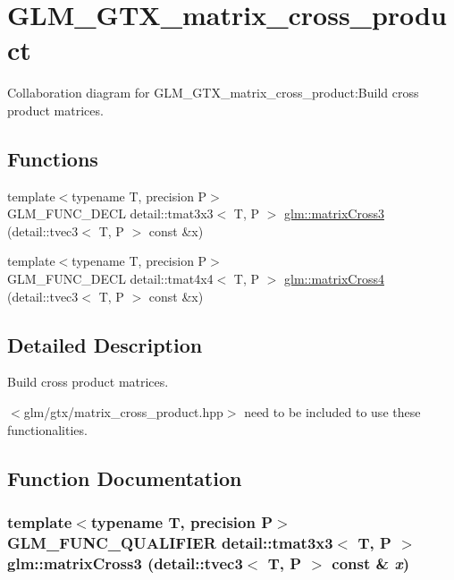 \hypertarget{group__gtx__matrix__cross__product}{
\section{GLM\_\-GTX\_\-matrix\_\-cross\_\-product}
\label{group__gtx__matrix__cross__product}
}


Collaboration diagram for GLM\_\-GTX\_\-matrix\_\-cross\_\-product:Build cross product matrices.  
\subsection*{Functions}
\begin{CompactItemize}
\item 
{\footnotesize template$<$typename T, precision P$>$ }\\GLM\_\-FUNC\_\-DECL detail::tmat3x3$<$ T, P $>$ \hyperlink{group__gtx__matrix__cross__product_g028629befca6d86f24f58e314827895c}{glm::matrixCross3} (detail::tvec3$<$ T, P $>$ const \&x)
\item 
{\footnotesize template$<$typename T, precision P$>$ }\\GLM\_\-FUNC\_\-DECL detail::tmat4x4$<$ T, P $>$ \hyperlink{group__gtx__matrix__cross__product_g9fae5322a4e4afe9742157f22b505635}{glm::matrixCross4} (detail::tvec3$<$ T, P $>$ const \&x)
\end{CompactItemize}


\subsection{Detailed Description}
Build cross product matrices. 

$<$glm/gtx/matrix\_\-cross\_\-product.hpp$>$ need to be included to use these functionalities. 

\subsection{Function Documentation}
\hypertarget{group__gtx__matrix__cross__product_g028629befca6d86f24f58e314827895c}{
\subsubsection[matrixCross3]{\setlength{\rightskip}{0pt plus 5cm}template$<$typename T, precision P$>$ GLM\_\-FUNC\_\-QUALIFIER detail::tmat3x3$<$ T, P $>$ glm::matrixCross3 (detail::tvec3$<$ T, P $>$ const \& {\em x})}}
\label{group__gtx__matrix__cross__product_g028629befca6d86f24f58e314827895c}


